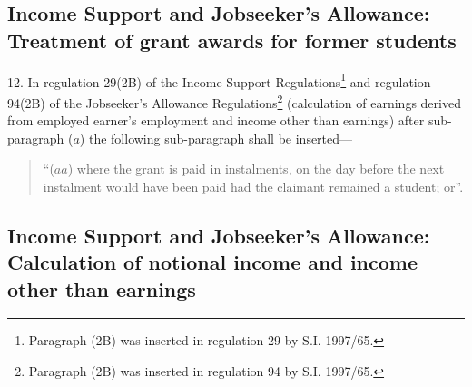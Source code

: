 \documentclass[12pt,a4paper]{article}
\begin{document}
\subsection[12. Income Support and Jobseeker’s Allowance: Treatment of grant awards for former students]{Income Support and Jobseeker’s Allowance: Treatment of grant awards for former students}

12.  In regulation 29(2B) of the Income Support Regulations\footnote{\frenchspacing Paragraph (2B) was inserted in regulation 29 by S.I. 1997/65.} and regulation 94(2B) of the Jobseeker’s Allowance Regulations\footnote{\frenchspacing Paragraph (2B) was inserted in regulation 94 by S.I. 1997/65.} (calculation of earnings derived from employed earner’s employment and income other than earnings) after sub-paragraph ($a$)  the following sub-paragraph shall be inserted—
\begin{quotation}
“($aa$) where the grant is paid in instalments, on the day before the next instalment would have been paid had the claimant remained a student; or”.
\end{quotation}

\subsection[13. Income Support and Jobseeker’s Allowance: Calculation of notional income and income other than earnings]{Income Support and Jobseeker’s Allowance: Calculation of notional income and income other than earnings}
\end{document}
